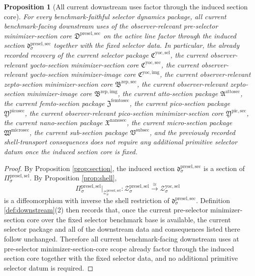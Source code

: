 \documentclass[11pt]{article}
\newcommand{\SubSectionPackage}{\mathfrak V^{\mathrm{subsec}}}
\newcommand{\MicroSectionPackage}{\mathfrak W^{\mathrm{microsec}}}
\newcommand{\NanoSectionPackage}{\mathfrak X^{\mathrm{nanosec}}}
\newcommand{\PicoSectionPackage}{\mathfrak Y^{\mathrm{picosec}}}
\newcommand{\PicoMinSectionCore}{\mathfrak Y^{\mathrm{pic,sec}}}
\newcommand{\FemtoSectionPackage}{\mathfrak Z^{\mathrm{femtosec}}}
\newcommand{\AttoSectionPackage}{\mathfrak A^{\mathrm{attosec}}}
\newcommand{\ZeptoImageCore}{\mathfrak B^{\mathrm{zep,img}}}
\newcommand{\ZeptoMinSectionCore}{\mathfrak B^{\mathrm{zep,sec}}}
\newcommand{\YoctoImageCore}{\mathfrak C^{\mathrm{yoc,img}}}
\newcommand{\YoctoMinSectionCore}{\mathfrak C^{\mathrm{yoc,sec}}}
\newcommand{\YoctoSelectorPackage}{\mathfrak C^{\mathrm{yoc,sel}}}
\newcommand{\YoctoSelectorShell}[1]{\mathcal Z_{#1}^{\mathrm{yoc,sel}}}
\newcommand{\PreSelectorMinSectionCore}{\mathfrak D^{\mathrm{presel,sec}}}
\newcommand{\PreSelectorMinSection}[1]{\mathfrak d_{#1}^{\mathrm{presel,sec}}}
\newcommand{\PreSectionSelectorProj}[1]{\Pi_{#1}^{\mathrm{presel,sel}}}
\newcommand{\PreSectionSelectorShell}[1]{\mathcal Z_{#1}^{\mathrm{presel,sel}}}
\newtheorem{proposition}{Proposition}
\begin{document}
\begin{proposition}[All current downstream uses factor through the induced section core]
\label{prop:downstream}
For every benchmark-faithful selector dynamics package, all current benchmark-facing downstream uses of the observer-relevant pre-selector minimizer-section core \(\PreSelectorMinSectionCore\) on the active line factor through the induced section \(\PreSelectorMinSection{\sigma}\) together with the fixed selector data. In particular, the already recorded recovery of the current selector package \(\YoctoSelectorPackage\), the current observer-relevant yocto-section minimizer-section core \(\YoctoMinSectionCore\), the current observer-relevant yocto-section minimizer-image core \(\YoctoImageCore\), the current observer-relevant zepto-section minimizer-section core \(\ZeptoMinSectionCore\), the current observer-relevant zepto-section minimizer-image core \(\ZeptoImageCore\), the current atto-section package \(\AttoSectionPackage\), the current femto-section package \(\FemtoSectionPackage\), the current pico-section package \(\PicoSectionPackage\), the current observer-relevant pico-section minimizer-section core \(\PicoMinSectionCore\), the current nano-section package \(\NanoSectionPackage\), the current micro-section package \(\MicroSectionPackage\), the current sub-section package \(\SubSectionPackage\), and the previously recorded shell-transport consequences does not require any additional primitive selector datum once the induced section core is fixed.
\end{proposition}

\begin{proof}
By Proposition \ref{prop:section}, the induced section \(\PreSelectorMinSection{\sigma}\) is a section of \(\PreSectionSelectorProj{\sigma}\). By Proposition \ref{prop:shell},
\[
\PreSectionSelectorProj{\sigma}\big|_{\PreSectionSelectorShell{\sigma}}
:
\PreSectionSelectorShell{\sigma}\xrightarrow{\cong}\YoctoSelectorShell{\sigma}
\]
is a diffeomorphism with inverse the shell restriction of \(\PreSelectorMinSection{\sigma}\). Definition \ref{def:downstream}(2) then records that, once the current pre-selector minimizer-section core over the fixed selector benchmark base is available, the current selector package and all of the downstream data and consequences listed there follow unchanged. Therefore all current benchmark-facing downstream uses at pre-selector minimizer-section-core scope already factor through the induced section core together with the fixed selector data, and no additional primitive selector datum is required.
\end{proof}
\end{document}
